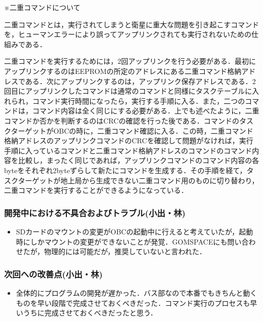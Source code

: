 \begin{enumerate}
	\par ※二重コマンドについて\par
	二重コマンドとは，実行されてしまうと衛星に重大な問題を引き起こすコマンドを，ヒューマンエラーにより誤ってアップリンクされても実行されないための仕組みである．\par
	二重コマンドを実行するためには，2回アップリンクを行う必要がある．最初にアップリンクするのはEEPROMの所定のアドレスにある二重コマンド格納アドレスである．次にアップリンクするのは，アップリンク保存アドレスである．2回目にアップリンクしたコマンドは通常のコマンドと同様にタスクテーブルに入れられ，コマンド実行時間になったら，実行する手順に入る．また，二つのコマンドは，コマンド内容は全く同じにする必要がある．上でも述べたように，二重コマンドか否かを判断するのはCRCの確認を行った後である．コマンドのタスクターゲットがOBCの時に，二重コマンド確認に入る．この時，二重コマンド格納アドレスのアップリンクコマンドのCRCを確認して問題がなければ，実行手順に入っているコマンドと二重コマンド格納アドレスのコマンドのコマンド内容を比較し，まったく同じであれば，アップリンクコマンドのコマンド内容の各byteをそれぞれ2byteずらして新たにコマンドを生成する．その手順を経て，タスクターゲットが地上局から生成できない二重コマンド用のものに切り替わり，二重コマンドを実行することができるようになっている．	

\end{enumerate}
\subsubsection{開発中における不具合およびトラブル(小出・林)}
\begin{itemize}
	\item SDカードのマウントの変更がOBCの起動中に行えると考えていたが，起動時にしかマウントの変更ができないことが発覚．GOMSPACEにも問い合わせたが，物理的には可能だが，推奨していないと言われた．
\end{itemize}
\subsubsection{次回への改善点(小出・林)}
\begin{itemize}
	\item 全体的にプログラムの開発が遅かった．バス部なので本番でもきちんと動くものを早い段階で完成させておくべきだった．コマンド実行のプロセスも早いうちに完成させておくべきだったと思う．
\end{itemize}
